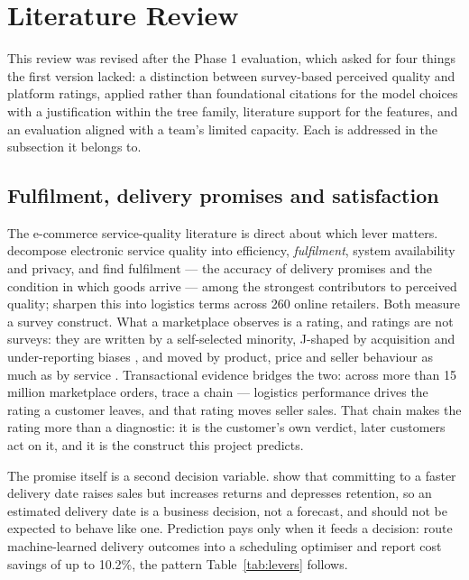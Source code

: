 \section{Literature Review}
\label{sec:lit}

This review was revised after the Phase 1 evaluation, which asked for four
things the first version lacked: a distinction between survey-based perceived
quality and platform ratings, applied rather than foundational citations for the
model choices with a justification within the tree family, literature support
for the features, and an evaluation aligned with a team's limited capacity.
Each is addressed in the subsection it belongs to.

\subsection{Fulfilment, delivery promises and satisfaction}

The e-commerce service-quality literature is direct about which lever matters.
\citet{parasuraman2005esqual} decompose electronic service quality into
efficiency, \emph{fulfilment}, system availability and privacy, and find
fulfilment --- the accuracy of delivery promises and the condition in which
goods arrive --- among the strongest contributors to perceived quality;
\citet{rao2011elsq} sharpen this into logistics terms across 260 online
retailers. Both measure a survey construct. What a marketplace observes is a
rating, and ratings are not surveys: they are written by a self-selected
minority, J-shaped by acquisition and under-reporting biases
\citep{hu2009jshaped, hu2017selfselection}, and moved by product, price and
seller behaviour as much as by service \citep{dellarocas2003digitization}.
Transactional evidence bridges the two: across more than 15 million marketplace
orders, \citet{deshpande2023logistics} trace a chain --- logistics performance
drives the rating a customer leaves, and that rating moves seller sales. That
chain makes the rating more than a diagnostic: it is the customer's own
verdict, later customers act on it, and it is the construct this project
predicts.

The promise itself is a second decision variable. \citet{cui2024promise} show
that committing to a faster delivery date raises sales but increases returns and
depresses retention, so an estimated delivery date is a business decision, not a
forecast, and should not be expected to behave like one. Prediction pays only
when it feeds a decision: \citet{kandula2021prescriptive} route machine-learned
delivery outcomes into a scheduling optimiser and report cost savings of up to
10.2\%, the pattern Table~\ref{tab:levers} follows.


